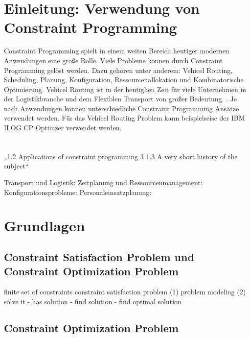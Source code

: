 




\tableofcontents

\clearpage
{}


\section{Einleitung: Verwendung von Constraint Programming}
\label{sec:Einleitung: Verwendung von Constraint Programming}
Constraint Programming spielt in einem weiten Bereich heutiger modernen
Anwendungen eine große Rolle. Viele Probleme können durch Constraint Programming
gelöst werden. Dazu gehören unter anderem: Vehicel Routing, Scheduling, Planung,
Konfiguration, Ressourcenallokation und Kombinatorische Optimierung. Vehicel
Routing ist in der heutighen Zeit für viele Unternehmen in der Logistikbranche
und dem Flexiblen Transport von großer Bedeutung. \cite[1]{delec22jo}. Je nach
Anwendungen können unterschiedliche Constraint Programming Ansätze verwendet
werden. Für das Vehicel Routing Problem kann beispielseise der IBM ILOG CP
Optimzer verwendet werden. \cite[text]{}
\\
\\
\\
„1.2 Applications of constraint programming 3 1.3 A very short history of the
subject“ \cite[6]{aptjo}


Transport und Logistik: Zeitplanung und Ressourcenmanagement:
Konfigurationsprobleme: Personaleinsatzplanung:

\cite[1-5]{rossi06bo}

\section{Grundlagen}
\subsection{Constraint Satisfaction Problem und Constraint Optimization Problem} 
\label{sec:Constraint Satisfaction Problem und Constraint Optimization Problem}



\label{sec:Grundlagen}
finite set of constraints \cite[1]{aptjo} constraint satisfaction problem
\cite[1]{aptjo} (1) problem modeling (2) solve it - has solution - find solution
- find optimal solution
\cite*[postnote]{aptjo}


\subsection{Constraint Optimization Problem}
\label{sec: Constraint Optimization Problem}


